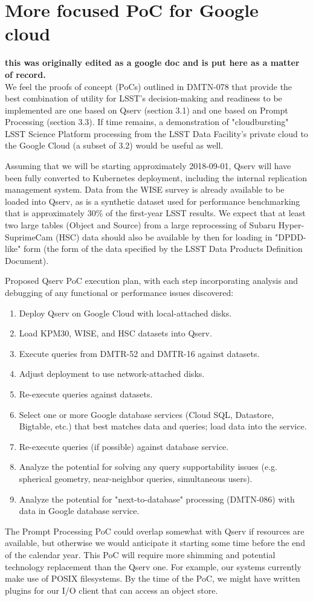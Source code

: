 
\section{More focused PoC for Google cloud}
{\bf this was originally edited as a google doc and is put here as a matter of record.}\\
We feel the proofs of concept (PoCs) outlined in DMTN-078 that provide the best combination of utility for LSST's decision-making and readiness to be implemented are one based on Qserv (section 3.1) and one based on Prompt Processing (section 3.3).  If time remains, a demonstration of "cloudbursting" LSST Science Platform processing from the LSST Data Facility's private cloud to the Google Cloud (a subset of 3.2) would be useful as well.

Assuming that we will be starting approximately 2018-09-01, Qserv will have been fully converted to Kubernetes deployment, including the internal replication management system.  Data from the WISE survey is already available to be loaded into Qserv, as is a synthetic dataset used for performance benchmarking that is approximately 30\% of the first-year LSST results.  We expect that at least two large tables (Object and Source) from a large reprocessing of Subaru Hyper-SuprimeCam (HSC) data should also be available by then for loading in "DPDD-like" form (the form of the data specified by the LSST Data Products Definition Document).

Proposed Qserv PoC execution plan, with each step incorporating analysis and debugging of any functional or performance issues discovered:
\begin{enumerate}
\item Deploy Qserv on Google Cloud with local-attached disks.
\item Load KPM30, WISE, and HSC datasets into Qserv.
\item Execute queries from DMTR-52 and DMTR-16 against datasets.
\item Adjust deployment to use network-attached disks.
\item Re-execute queries against datasets.
\item Select one or more Google database services (Cloud SQL, Datastore, Bigtable, etc.) that best matches data and queries; load data into the service.
\item Re-execute queries (if possible) against database service.
\item Analyze the potential for solving any query supportability issues (e.g. spherical geometry, near-neighbor queries, simultaneous users).
\item Analyze the potential for "next-to-database" processing (DMTN-086) with data in Google database service.
\end{enumerate}
The Prompt Processing PoC could overlap somewhat with Qserv if resources are available, but otherwise we would anticipate it starting some time before the end of the calendar year.  This PoC will require more shimming and potential technology replacement than the Qserv one.  For example, our systems currently make use of POSIX filesystems.  By the time of the PoC, we might have written plugins for our I/O client that can access an object store.

